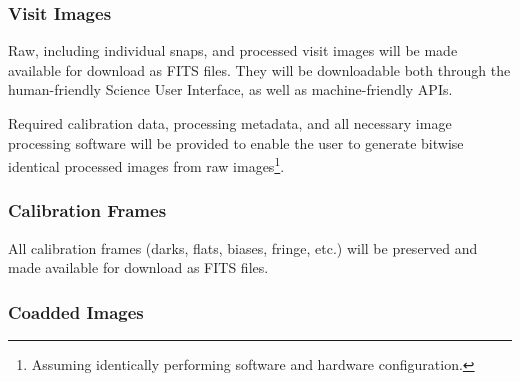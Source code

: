 \documentclass[12pt]{article}
\begin{document}
\subsubsection{Visit Images}

Raw, including individual snaps, and processed visit images will be made available for download as FITS files. They will be downloadable both through the human-friendly Science User Interface, as well as machine-friendly APIs.

Required calibration data, processing metadata, and all necessary image processing software will be provided to enable the user to generate bitwise identical processed images from raw images\footnote{Assuming identically performing software and hardware configuration.}.

\subsubsection{Calibration Frames}

All calibration frames (darks, flats, biases, fringe, etc.) will be preserved and made available for download as FITS files.

\subsubsection{Coadded Images}
\label{sec:coadds}
\end{document}
